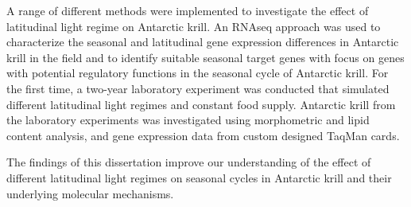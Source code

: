 A range of different methods were implemented to investigate the effect of latitudinal light regime on Antarctic krill. An RNAseq approach was used to characterize the seasonal and latitudinal gene expression differences in Antarctic krill in the field and to identify suitable seasonal target genes with focus on genes with potential regulatory functions in the seasonal cycle of Antarctic krill. For the first time, a two-year laboratory experiment was conducted that simulated different latitudinal light regimes and constant food supply. Antarctic krill from the laboratory experiments was investigated using morphometric and lipid content analysis, and gene expression data from custom designed TaqMan cards.

The findings of this dissertation improve our understanding of the effect of different latitudinal light regimes on seasonal cycles in Antarctic krill and their underlying molecular mechanisms.
